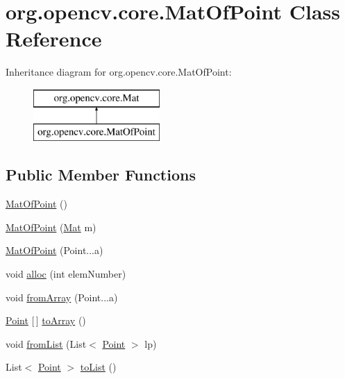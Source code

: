 \hypertarget{classorg_1_1opencv_1_1core_1_1_mat_of_point}{}\section{org.\+opencv.\+core.\+Mat\+Of\+Point Class Reference}
\label{classorg_1_1opencv_1_1core_1_1_mat_of_point}
Inheritance diagram for org.\+opencv.\+core.\+Mat\+Of\+Point\+:\begin{figure}[H]
\begin{center}
\leavevmode
\includegraphics[height=2.000000cm]{classorg_1_1opencv_1_1core_1_1_mat_of_point}
\end{center}
\end{figure}
\subsection*{Public Member Functions}
\begin{DoxyCompactItemize}
\item 
\mbox{\hyperlink{classorg_1_1opencv_1_1core_1_1_mat_of_point_aba1cad0331da2b6895f8b706999472be}{Mat\+Of\+Point}} ()
\item 
\mbox{\hyperlink{classorg_1_1opencv_1_1core_1_1_mat_of_point_ab6af84d30b2338d577838343ef3d7f46}{Mat\+Of\+Point}} (\mbox{\hyperlink{classorg_1_1opencv_1_1core_1_1_mat}{Mat}} m)
\item 
\mbox{\hyperlink{classorg_1_1opencv_1_1core_1_1_mat_of_point_a84f39897463caf8a1d4079f5f317c9b7}{Mat\+Of\+Point}} (Point...\+a)
\item 
void \mbox{\hyperlink{classorg_1_1opencv_1_1core_1_1_mat_of_point_afec43e3844a7df0cb3bd51f5302487c6}{alloc}} (int elem\+Number)
\item 
void \mbox{\hyperlink{classorg_1_1opencv_1_1core_1_1_mat_of_point_ac9cbd2b55ec30f6c0dd5322598aab34f}{from\+Array}} (Point...\+a)
\item 
\mbox{\hyperlink{classorg_1_1opencv_1_1core_1_1_point}{Point}} \mbox{[}$\,$\mbox{]} \mbox{\hyperlink{classorg_1_1opencv_1_1core_1_1_mat_of_point_ac91e4fd3a2b163fd305b0b90ff0aba33}{to\+Array}} ()
\item 
void \mbox{\hyperlink{classorg_1_1opencv_1_1core_1_1_mat_of_point_a7903e53242718154cf8de893a2b34533}{from\+List}} (List$<$ \mbox{\hyperlink{classorg_1_1opencv_1_1core_1_1_point}{Point}} $>$ lp)
\item 
List$<$ \mbox{\hyperlink{classorg_1_1opencv_1_1core_1_1_point}{Point}} $>$ \mbox{\hyperlink{classorg_1_1opencv_1_1core_1_1_mat_of_point_aa000b49047eb9d596617b6a2fbc7ad67}{to\+List}} ()
\end{DoxyCompactItemize}
